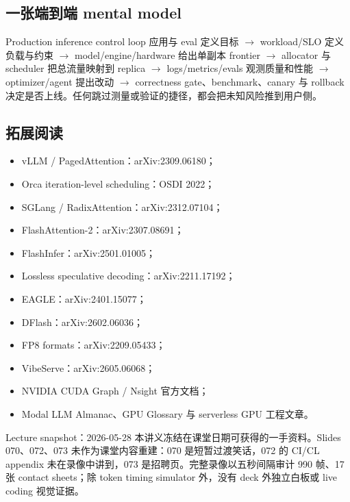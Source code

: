 \subsection{一张端到端 mental model}

\begin{knowledgebox}{Production inference control loop}
应用与 eval 定义目标 $\rightarrow$ workload/SLO 定义负载与约束 $\rightarrow$ model/engine/hardware 给出单副本 frontier $\rightarrow$ allocator 与 scheduler 把总流量映射到 replica $\rightarrow$ logs/metrics/evals 观测质量和性能 $\rightarrow$ optimizer/agent 提出改动 $\rightarrow$ correctness gate、benchmark、canary 与 rollback 决定是否上线。任何跳过测量或验证的捷径，都会把未知风险推到用户侧。
\end{knowledgebox}

\subsection{拓展阅读}

\begin{itemize}
  \item vLLM / PagedAttention：arXiv:2309.06180；
  \item Orca iteration-level scheduling：OSDI 2022；
  \item SGLang / RadixAttention：arXiv:2312.07104；
  \item FlashAttention-2：arXiv:2307.08691；
  \item FlashInfer：arXiv:2501.01005；
  \item Lossless speculative decoding：arXiv:2211.17192；
  \item EAGLE：arXiv:2401.15077；
  \item DFlash：arXiv:2602.06036；
  \item FP8 formats：arXiv:2209.05433；
  \item VibeServe：arXiv:2605.06068；
  \item NVIDIA CUDA Graph / Nsight 官方文档；
  \item Modal LLM Almanac、GPU Glossary 与 serverless GPU 工程文章。
\end{itemize}

\begin{knowledgebox}{Lecture snapshot：2026-05-28}
本讲义冻结在课堂日期可获得的一手资料。Slides 070、072、073 未作为课堂内容重建：070 是短暂过渡笑话，072 的 CI/CL appendix 未在录像中讲到，073 是招聘页。完整录像以五秒间隔审计 990 帧、17 张 contact sheets；除 token timing simulator 外，没有 deck 外独立白板或 live coding 视觉证据。
\end{knowledgebox}


